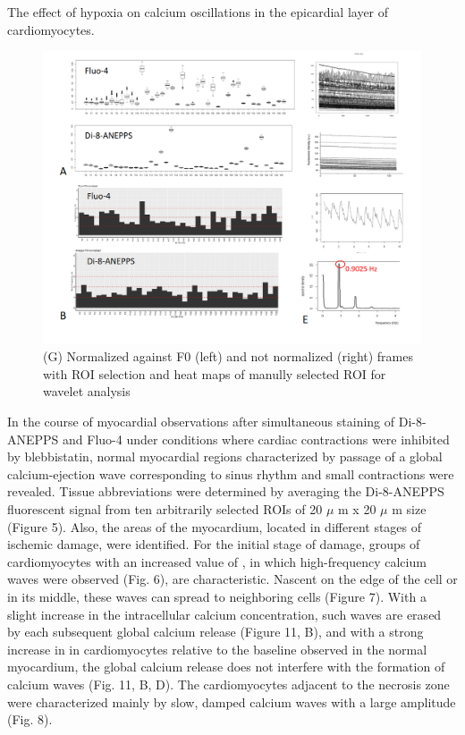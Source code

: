 \documentclass{biophys-new}
\begin{document}
The effect of hypoxia on calcium oscillations in the epicardial layer of cardiomyocytes.


\begin{figure}
    \includegraphics[width=0.9\linewidth]{fig4.png}
    \caption{(G) Normalized against F0 (left) and not normalized (right) frames with ROI selection and heat maps of manully selected ROI for wavelet analysis}
    \label{fig:fig4}
\end{figure}


In the course of myocardial observations after simultaneous staining of Di-8-ANEPPS and Fluo-4 under conditions where cardiac contractions were inhibited by blebbistatin, normal myocardial regions characterized by passage of a global calcium-ejection wave corresponding to sinus rhythm and small contractions were revealed. Tissue abbreviations were determined by averaging the Di-8-ANEPPS fluorescent signal from ten arbitrarily selected ROIs of 20 $\mu$ m x 20 $\mu$ m size (Figure 5). Also, the areas of the myocardium, located in different stages of ischemic damage, were identified. For the initial stage of damage, groups of cardiomyocytes with an increased value of , in which high-frequency calcium waves were observed (Fig. 6), are characteristic. Nascent on the edge of the cell or in its middle, these waves can spread to neighboring cells (Figure 7). With a slight increase in the intracellular calcium concentration, such waves are erased by each subsequent global calcium release (Figure 11, B), and with a strong increase in  in cardiomyocytes relative to the baseline observed in the normal myocardium, the global calcium release does not interfere with the formation of calcium waves (Fig. 11, B, D). The cardiomyocytes adjacent to the necrosis zone were characterized mainly by slow, damped calcium waves with a large amplitude (Fig. 8).
\end{document}
